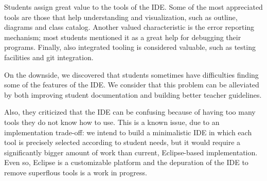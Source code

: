Students assign great value to the tools of the IDE.
Some of the most appreciated tools are those that help understanding and visualization, 
such as outline, diagrams and class catalog.
Another valued characteristic is the error reporting mechanism;
most students mentioned it as a great help for debugging their programs.
Finally, also integrated tooling is considered valuable, 
such as testing facilities and git integration.




%
%
%
\medskip

On the downside, 
we discovered that students sometimes have difficulties finding some of the features of the IDE.
We consider that this problem can be alleviated by both improving student documentation and building better teacher guidelines.

Also, they criticized that the IDE can be confusing because of having too many tools they do not know how to use.
This is a known issue, due to an implementation trade-off: 
we intend to build a minimalistic IDE in which each tool is precisely selected according to student needs,
but it would require a significantly bigger amount of work than current, Eclipse-based implementation.
Even so, Eclipse is a customizable platform and the depuration of the IDE to remove superflous tools is a work in progress.


